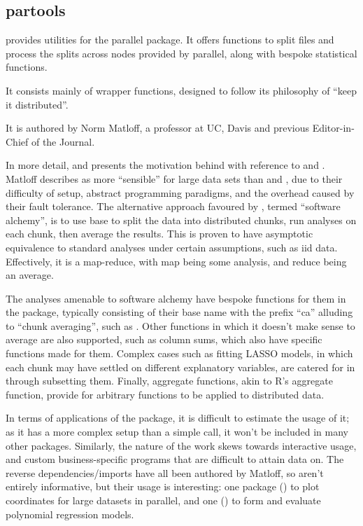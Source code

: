 \subsection{partools}\label{subsec:partools}

 provides utilities for the parallel
package\cite{matloff16softw_alchemy}. It offers functions to split
files and process the splits across nodes provided by parallel, along
with bespoke statistical functions.

It consists mainly of wrapper functions, designed to follow its
philosophy of ``keep it distributed''.

It is authored by Norm Matloff, a professor at UC, Davis and previous
Editor-in-Chief of the \R{} Journal.

In more detail, \textcite{matloff15} and \textcite{matloff17} presents the
motivation behind  with reference to  and . Matloff
describes  as more ``sensible'' for large data sets than 
and , due to their difficulty of setup, abstract programming
paradigms, and the overhead caused by their fault tolerance. The
alternative approach favoured by , termed ``software alchemy'',
is to use base \R{} to split the data into distributed chunks, run analyses
on each chunk, then average the results. This is proven to have
asymptotic equivalence to standard analyses under certain assumptions,
such as iid data. Effectively, it is a map-reduce, with map being some
analysis, and reduce being an average.

The analyses amenable to software alchemy have bespoke functions for
them in the package, typically consisting of their base \R{} name with the
prefix ``ca'' alluding to ``chunk averaging'', such as
. Other functions in which it
doesn't make sense to average are also supported, such as column sums,
which also have specific functions made for them. Complex cases such as
fitting LASSO models, in which each chunk may have settled on different
explanatory variables, are catered for in  through subsetting
them. Finally, aggregate functions, akin to R's aggregate function,
provide for arbitrary functions to be applied to distributed data.

In terms of applications of the package, it is difficult to estimate the
usage of it; as it has a more complex setup than a simple
 call, it won't be included in many other packages.
Similarly, the nature of the work skews towards interactive usage, and
custom business-specific programs that are difficult to attain data on.
The reverse dependencies/imports have all been authored by Matloff, so
aren't entirely informative, but their usage is interesting: one package
() to plot coordinates for large datasets in parallel, and one
() to form and evaluate polynomial regression models.

